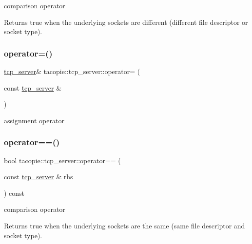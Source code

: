 comparison operator

\begin{DoxyReturn}{Returns}
true when the underlying sockets are different (different file descriptor or socket type). 
\end{DoxyReturn}
\mbox{\label{classtacopie_1_1tcp__server_a7e7da4352e2e016f8d40d19bf9fee54b}} 
\subsubsection{\texorpdfstring{operator=()}{operator=()}}
{\footnotesize\ttfamily \hyperlink{classtacopie_1_1tcp__server}{tcp\+\_\+server}\& tacopie\+::tcp\+\_\+server\+::operator= (\begin{DoxyParamCaption}\item[{const \hyperlink{classtacopie_1_1tcp__server}{tcp\+\_\+server} \&}]{ }\end{DoxyParamCaption})\hspace{0.3cm}{\ttfamily [delete]}}



assignment operator 

\mbox{\label{classtacopie_1_1tcp__server_ab9b95a27afb405668bb4d5b1a312ceae}} 
\subsubsection{\texorpdfstring{operator==()}{operator==()}}
{\footnotesize\ttfamily bool tacopie\+::tcp\+\_\+server\+::operator== (\begin{DoxyParamCaption}\item[{const \hyperlink{classtacopie_1_1tcp__server}{tcp\+\_\+server} \&}]{rhs }\end{DoxyParamCaption}) const}

comparison operator

\begin{DoxyReturn}{Returns}
true when the underlying sockets are the same (same file descriptor and socket type). 
\end{DoxyReturn}
\mbox{\label{classtacopie_1_1tcp__server_a6cb98b50d865b32dba497273a0eca1e9}} 
